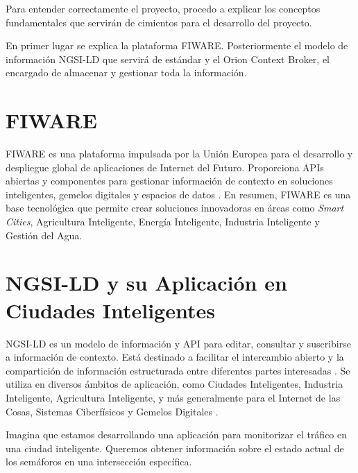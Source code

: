 
Para entender correctamente el proyecto, procedo a explicar los conceptos fundamentales que servirán de cimientos para el desarrollo del proyecto.

En primer lugar se explica la plataforma FIWARE. Posteriormente el modelo de información NGSI-LD que servirá de estándar y el Orion Context Broker, el encargado de almacenar y gestionar toda la información.

\section{FIWARE}
FIWARE es una plataforma impulsada por la Unión Europea para el desarrollo y despliegue 
global de aplicaciones de Internet del Futuro. Proporciona APIs abiertas y componentes para 
gestionar información de contexto en soluciones inteligentes, gemelos digitales y espacios de 
datos \cite{fiware}. En resumen, FIWARE es una base tecnológica que permite crear soluciones 
innovadoras en áreas como \textit{Smart Cities}, Agricultura Inteligente, Energía Inteligente, Industria Inteligente y Gestión del Agua. 

\section{NGSI-LD y su Aplicación en Ciudades Inteligentes}

NGSI-LD es un modelo de información y API para editar, consultar y suscribirse a información de contexto. Está destinado a facilitar el intercambio abierto y la compartición de información estructurada entre diferentes partes interesadas \cite{etsi_ngsi_ld}. Se utiliza en diversos ámbitos de aplicación, como Ciudades Inteligentes, Industria Inteligente, Agricultura Inteligente, y más generalmente para el Internet de las Cosas, Sistemas Ciberfísicos y Gemelos Digitales \cite{etsi_iot}.

Imagina que estamos desarrollando una aplicación para monitorizar el tráfico en una ciudad inteligente. Queremos obtener información sobre el estado actual de los semáforos en una intersección específica.

